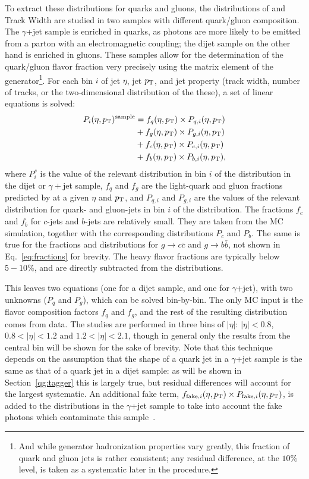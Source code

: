 To extract these distributions for quarks and gluons, the distributions of \ntrk and Track Width are studied in two samples with different quark/gluon composition. The $\gamma$+jet sample is enriched in quarks, as photons are more likely to be emitted from a parton with an electromagnetic coupling; the dijet sample on the other hand is enriched in gluons. These samples allow for the determination of the quark/gluon flavor fraction very precisely using the matrix element of the generator\footnote{And while generator hadronization properties vary greatly, this fraction of quark and gluon jets is rather consistent; any residual difference, at the $10\%$ level, is taken as a systematic later in the procedure.}. For each bin $i$ of jet $\eta$, jet $p_{\text{T}}$, and jet property (track width, number of tracks, or the two-dimensional distribution of the these), a set of linear equations is solved:
%
\begin{align}
P_i(\eta,p_{\text{T}})^\mathrm{sample} &= f_{q}(\eta,p_{\text{T}}) \times P_{q,i}(\eta,p_{\text{T}}) \nonumber \\
	& + f_{g}(\eta,p_{\text{T}}) \times P_{g,i}(\eta,p_{\text{T}}) \nonumber \\
& + f_{c}(\eta,p_{\text{T}}) \times P_{c,i}(\eta,p_{\text{T}}) \nonumber \\
& + f_{b}(\eta,p_{\text{T}}) \times P_{b,i}(\eta,p_{\text{T}}) , 
\label{eq:fractions}
\end{align}
%
where $P_i^{s}$ is the value of the relevant distribution in bin $i$ of the distribution in the dijet
or $\gamma+$jet sample, $f_{q}$ and $f_{g}$ are the light-quark and gluon fractions 
predicted by \Pythia at a given $\eta$ and $p_{\text{T}}$, 
and $P_{q,i}$ and $P_{g,i}$ are the values of the relevant distribution 
for quark- and gluon-jets in bin $i$ of the distribution. The fractions 
$f_{c}$ and $f_{b}$ for $c$-jets and $b$-jets are relatively small. They are taken from the
MC simulation, together with the corresponding distributions $P_{c}$ and $P_{b}$.
The same is true for the fractions and distributions for $g\rightarrow c\bar{c}$ and $g\rightarrow b\bar{b}$,
not shown in Eq.~\ref{eq:fractions} for brevity. The heavy flavor fractions are typically below $5-10\%$, and are directly subtracted from the distributions.

This leaves two equations (one for a dijet sample, and one for $\gamma$+jet), with two unknowns ($P_{q}$ and $P_{g}$), which can be solved bin-by-bin. The only MC input is the flavor composition factors $f_q$ and $f_g$, and the rest of the resulting distribution comes from data. The studies are performed in three bins of $|\eta|$: $|\eta|<0.8$, $0.8<|\eta|<1.2$ and $1.2<|\eta|<2.1$, though in general only the results from the central bin will be shown for the sake of brevity. Note that this technique depends on the assumption that the shape of a quark jet in a $\gamma$+jet sample is the same as that of a quark jet in a dijet sample: as will be shown in Section~\ref{qg:tagger} this is largely true, but residual differences will account for the largest systematic. An additional fake term,  $f_{{\rm fake}, i}(\eta,p_{\text{T}})\times P_{{\rm fake}, i}(\eta,p_{\text{T}})$, is added to the distributions in the $\gamma$+jet sample to take into account the fake photons which contaminate this sample~\cite{JES2011}.

